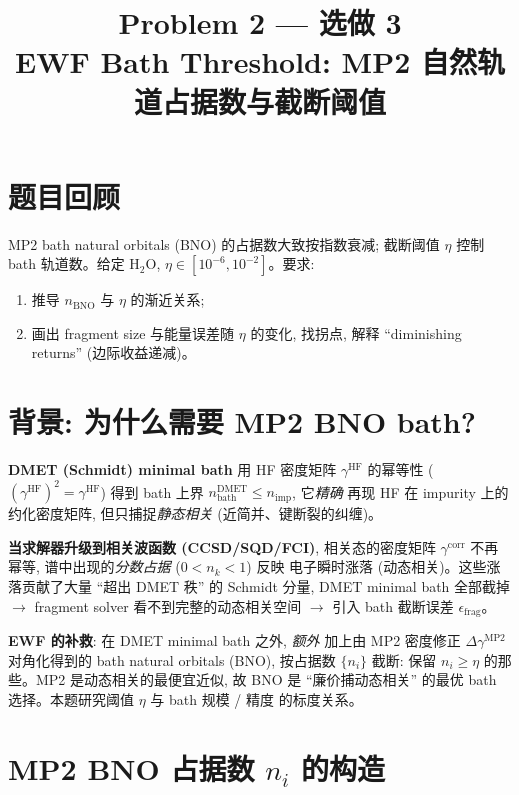 \documentclass[11pt]{article}
\title{\textbf{Problem 2 --- 选做 3}\\EWF Bath Threshold: MP2 自然轨道占据数与截断阈值}
\date{}
\begin{document}
\maketitle

\section*{题目回顾}
MP2 bath natural orbitals (BNO) 的占据数大致按指数衰减; 截断阈值 $\eta$ 控制 bath
轨道数。给定 H$_2$O, $\eta\in[10^{-6},10^{-2}]$。要求:
\begin{enumerate}
  \item 推导 $n_{\text{BNO}}$ 与 $\eta$ 的渐近关系;
  \item 画出 fragment size 与能量误差随 $\eta$ 的变化, 找拐点, 解释
        ``diminishing returns'' (边际收益递减)。
\end{enumerate}

\section{背景: 为什么需要 MP2 BNO bath?}
\textbf{DMET (Schmidt) minimal bath} 用 HF 密度矩阵 $\gamma^{\text{HF}}$
的幂等性 ($(\gamma^{\text{HF}})^2{=}\gamma^{\text{HF}}$) 得到 bath 上界
$n_{\text{bath}}^{\text{DMET}}\le n_{\text{imp}}$, 它\emph{精确} 再现 HF 在
impurity 上的约化密度矩阵, 但只捕捉\emph{静态相关} (近简并、键断裂的纠缠)。

\textbf{当求解器升级到相关波函数 (CCSD/SQD/FCI)}, 相关态的密度矩阵
$\gamma^{\text{corr}}$ 不再幂等, 谱中出现的\emph{分数占据} ($0<n_k<1$) 反映
电子瞬时涨落 (动态相关)。这些涨落贡献了大量 ``超出 DMET 秩'' 的 Schmidt 分量,
DMET minimal bath 全部截掉 $\to$ fragment solver 看不到完整的动态相关空间 $\to$
引入 bath 截断误差 $\epsilon_{\text{frag}}$。

\textbf{EWF 的补救}: 在 DMET minimal bath 之外, \emph{额外} 加上由 MP2 密度修正
$\Delta\gamma^{\text{MP2}}$ 对角化得到的 bath natural orbitals (BNO), 按占据数
$\{n_i\}$ 截断: 保留 $n_i\ge\eta$ 的那些。MP2 是动态相关的最便宜近似, 故 BNO 是
``廉价捕动态相关'' 的最优 bath 选择。本题研究阈值 $\eta$ 与 bath 规模 / 精度
的标度关系。

\section{MP2 BNO 占据数 $n_i$ 的构造}
\end{document}
